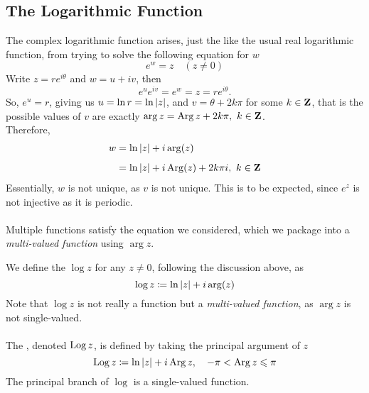 \subsection{The Logarithmic Function}
%
\begin{discussion}
The complex logarithmic function arises, just the like the usual real logarithmic function, from trying to solve the following equation for $w$
\[e^w = z\quad (z \neq 0)\]
Write $z = re^{i\theta}$ and $w = u + iv$, then 
\[e^u e^{iv} = e^w = z = re^{i\theta}.\]
So, $e^u = r$, giving us $u = \ln r = \ln\left\lvert z\right\rvert$, and $v = \theta + 2k\pi$ for some $k \in \mathbf Z$, that is the possible values of $v$ are exactly $\arg z = \operatorname{Arg} z + 2k\pi,\ k \in \mathbf Z$.\\[0.5em]
Therefore, 
\begin{align*}
w &= \ln\left\lvert z\right\rvert + i\arg(z)\\[0.5em]
&= \ln\left\lvert z\right\rvert + i\operatorname{Arg}(z) + 2k\pi i,\ k \in \mathbf Z
\end{align*}
Essentially, $w$ is not unique, as $v$ is not unique. This is to be expected, since $e^z$ is not injective as it is periodic.\\
\\
Multiple functions satisfy the equation we considered, which we package into a \emph{multi-valued function} using $\arg z$.
\end{discussion}

\medskip

\begin{definition}
We define the  $\log z$ for any $z \neq 0$, following the discussion above, as
\[\log z \coloneqq \ln\left\lvert z\right\rvert + i\arg(z)\]
Note that $\log z$ is not really a function but a \emph{multi-valued function}, as $\arg z$ is not single-valued.\\
\\
The , denoted $\operatorname{Log} z$, is defined by taking the principal argument of $z$
\[\operatorname{Log} z \coloneqq \ln\left\lvert z\right\rvert + i\operatorname{Arg} z,\quad -\pi < \operatorname{Arg} z \leqslant \pi\]
The principal branch of $\log$ is a single-valued function.
\end{definition}

\medskip

